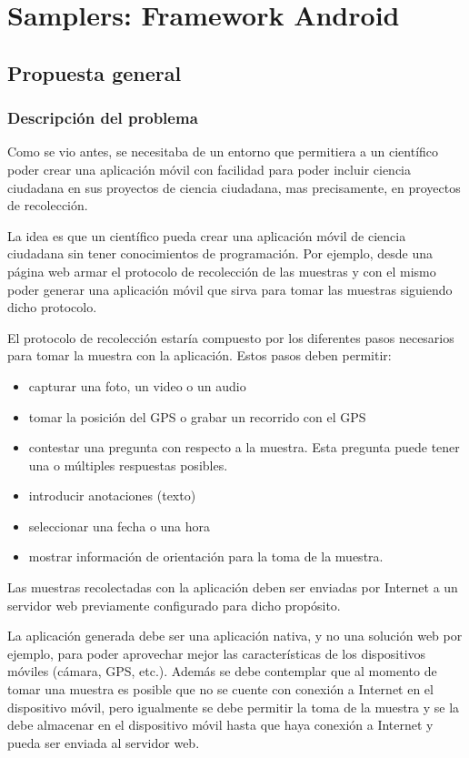\chapter{Samplers: Framework Android}

\section{Propuesta general}

\subsection{Descripción del problema}

Como se vio antes, se necesitaba de un entorno que permitiera a un científico poder crear una aplicación móvil con facilidad para poder incluir ciencia ciudadana en sus proyectos de ciencia ciudadana, mas precisamente, en proyectos de recolección.

La idea es que un científico pueda crear una aplicación móvil de ciencia ciudadana sin tener conocimientos de programación. Por ejemplo, desde una página web armar el protocolo de recolección de las muestras y con el mismo poder generar una aplicación móvil que sirva para tomar las muestras siguiendo dicho protocolo.

El protocolo de recolección estaría compuesto por los diferentes pasos necesarios para tomar la muestra con la aplicación. Estos pasos deben permitir:
\begin{itemize}
\item capturar una foto, un video o un audio
\item tomar la posición del GPS o grabar un recorrido con el GPS
\item contestar una pregunta con respecto a la muestra. Esta pregunta puede tener una o múltiples respuestas posibles.
\item introducir anotaciones (texto)
\item seleccionar una fecha o una hora
\item mostrar información de orientación para la toma de la muestra.
\end{itemize}

Las muestras recolectadas con la aplicación deben ser enviadas por Internet a un servidor web previamente configurado para dicho propósito.

La aplicación generada debe ser una aplicación nativa, y no una solución web por ejemplo, para poder aprovechar mejor las características de los dispositivos móviles (cámara, GPS, etc.). Además se debe contemplar que al momento de tomar una muestra es posible que no se cuente con conexión a Internet en el dispositivo móvil, pero igualmente se debe permitir la toma de la muestra y se la debe almacenar en el dispositivo móvil hasta que haya conexión a Internet y pueda ser enviada al servidor web.

